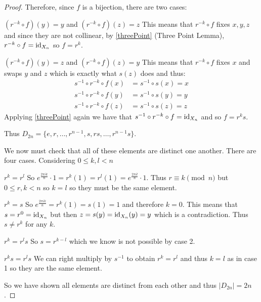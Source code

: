 \documentclass[../main.tex]{subfiles}
\begin{document}
\begin{proof}
  Therefore, since $f$ is a bijection, there are two cases:
  \begin{proofcases}
    \begin{case}{$(r^{-k} \circ f)(y) = y$ and $(r^{-k} \circ f)(z) = z$}
      This means that $r^{-k} \circ f$ fixes $x, y, z$ and since they are not collinear, by \cref{threePoint} (Three Point Lemma), $r^{-k} \circ f = \mathrm{id}_{X_n}$ so $f = r^{k}$.
    \end{case}
    \begin{case}{$(r^{-k} \circ f)(y) = z$ and $(r^{-k} \circ f)(z) = y$}
      This means that $r^{-k} \circ f$ fixes $x$ and swaps $y$ and $z$ which is exactly what $s(z)$ does and thus:
      \begin{align*}
        s^{-1} \circ r^{-k} \circ f(x) &= s^{-1} \circ s(x) = x \\
        s^{-1} \circ r^{-k} \circ f(y) &= s^{-1} \circ s(y) = y \\
        s^{-1} \circ r^{-k} \circ f(z) &= s^{-1} \circ s(z) = z
      \end{align*}
      Applying \cref{threePoint} again we have that $s^{-1} \circ r^{-k} \circ f = \mathrm{id}_{X_n}$ and so $f = r^{k} s$.
    \end{case}
  \end{proofcases}
  Thus $D_{2n} = \{e, r, \ldots, r^{n-1}, s, rs, \ldots, r^{n-1}s\}$.

  We now must check that all of these elements are distinct one another.
  There are four cases.
  Considering $0 \leq k, l < n$
  \begin{proofcases}
    \begin{case}{$r^{k} = r^{l}$}
      So $e^{\frac{2 \pi i k}{n}} \cdot 1 = r^{k}(1) = r^{l}(1) = e^{\frac{2\pi i l}{n}} \cdot 1$.
      Thus $r \equiv k \pmod{n}$ but $0 \leq r, k < n$ so $k = l$ so they must be the same element.
    \end{case}
    \begin{case}{$r^{k} = s$}
      So $e^{\frac{2 \pi i k}{n}} = r^{k}(1) = s(1) = 1$ and therefore $k = 0$.
      This means that $s = r^{0} = \mathrm{id}_{X_n}$ but then $z = s(y) = \mathrm{id}_{X_n}(y) = y$ which is a contradiction.
      Thus $s \neq r^{k}$ for any $k$.
    \end{case}
    \begin{case}{$r^{k} = r^{l}s$}
      So $s = r^{k - l}$ which we know is not possible by case 2.
    \end{case}
    \begin{case}{$r^{k}s = r^{l}s$}
      We can right multiply by $s^{-1}$ to obtain $r^{k} = r^{l}$ and thus $k = l$ as in case 1 so they are the same element.
    \end{case}
  \end{proofcases}
  So we have shown all elements are distinct from each other and thus $|D_{2n}| = 2n$.
\end{proof}
\end{document}
